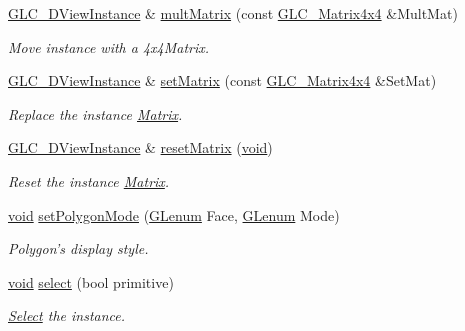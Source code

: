 \begin{DoxyCompactItemize}
\hyperlink{class_g_l_c__3_d_view_instance}{G\-L\-C\-\_\-D\-View\-Instance} \& \hyperlink{class_g_l_c__3_d_view_instance_a911fbe6e89716e22896fe21967f7afa7}{mult\-Matrix} (const \hyperlink{class_g_l_c___matrix4x4}{G\-L\-C\-\_\-\-Matrix4x4} \&Mult\-Mat)
\begin{DoxyCompactList}\small\item\em Move instance with a 4x4\-Matrix. \end{DoxyCompactList}\item 
\hyperlink{class_g_l_c__3_d_view_instance}{G\-L\-C\-\_\-D\-View\-Instance} \& \hyperlink{class_g_l_c__3_d_view_instance_a1c0cec8a4f6d8d5d65c7eac8aa3fec3c}{set\-Matrix} (const \hyperlink{class_g_l_c___matrix4x4}{G\-L\-C\-\_\-\-Matrix4x4} \&Set\-Mat)
\begin{DoxyCompactList}\small\item\em Replace the instance \hyperlink{class_matrix}{Matrix}. \end{DoxyCompactList}\item 
\hyperlink{class_g_l_c__3_d_view_instance}{G\-L\-C\-\_\-D\-View\-Instance} \& \hyperlink{class_g_l_c__3_d_view_instance_aaea44cb7e1d6b29e58d50fe2874d22d6}{reset\-Matrix} (\hyperlink{group___u_a_v_objects_plugin_ga444cf2ff3f0ecbe028adce838d373f5c}{void})
\begin{DoxyCompactList}\small\item\em Reset the instance \hyperlink{class_matrix}{Matrix}. \end{DoxyCompactList}\item 
\hyperlink{group___u_a_v_objects_plugin_ga444cf2ff3f0ecbe028adce838d373f5c}{void} \hyperlink{class_g_l_c__3_d_view_instance_af988d9507acc527ea4b9bc8d90ae875b}{set\-Polygon\-Mode} (\hyperlink{glext_8h_a508b2dec21679e2e346cad3e0d1969bf}{G\-Lenum} Face, \hyperlink{glext_8h_a508b2dec21679e2e346cad3e0d1969bf}{G\-Lenum} Mode)
\begin{DoxyCompactList}\small\item\em Polygon's display style. \end{DoxyCompactList}\item 
\hyperlink{group___u_a_v_objects_plugin_ga444cf2ff3f0ecbe028adce838d373f5c}{void} \hyperlink{class_g_l_c__3_d_view_instance_a9299e00b87be59a5adbeb259b2770f27}{select} (bool primitive)
\begin{DoxyCompactList}\small\item\em \hyperlink{class_select}{Select} the instance. \end{DoxyCompactList}\item 

\end{DoxyCompactItemize}
